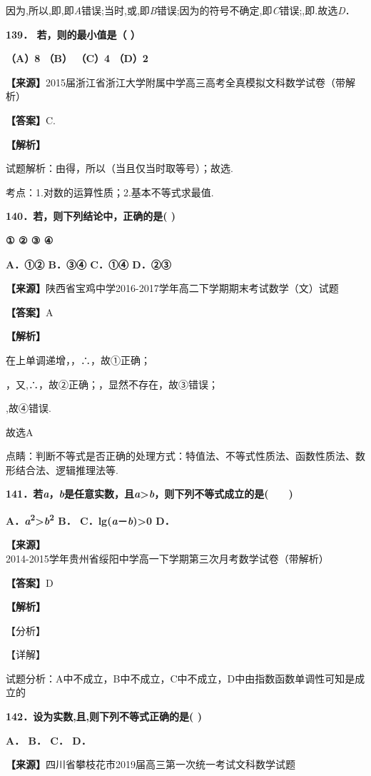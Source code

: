 \documentclass[
]{article}
\begin{document}
因为,所以,即,即\emph{A}错误;当时,或,即\emph{B}错误;因为的符号不确定,即\emph{C}错误;,即.故选\emph{D}．

\textbf{139． 若，则的最小值是（ ）}

\textbf{（A）8 （B） （C）4 （D）2}

\textbf{【来源】}2015届浙江省浙江大学附属中学高三高考全真模拟文科数学试卷（带解析）

\textbf{【答案】}C.

\textbf{【解析】}

试题解析：由得，所以（当且仅当时取等号）；故选.

考点：1.对数的运算性质；2.基本不等式求最值.

\textbf{140．若，则下列结论中，正确的是( )}

\textbf{① ② ③ ④}

\textbf{A．①② B．③④ C．①④ D．②③}

\textbf{【来源】}陕西省宝鸡中学2016-2017学年高二下学期期末考试数学（文）试题

\textbf{【答案】}A

\textbf{【解析】}

在上单调递增，，∴，故①正确；

，又,∴，故②正确；，显然不存在，故③错误；

,故④错误.

故选A

点睛：判断不等式是否正确的处理方式：特值法、不等式性质法、函数性质法、数形结合法、逻辑推理法等.

\textbf{141．若\emph{a}，\emph{b}是任意实数，且\emph{a}\textgreater{}\emph{b}，则下列不等式成立的是(　　)}

\textbf{A．\emph{a}\textsuperscript{2}\textgreater{}\emph{b}\textsuperscript{2}
B． C．lg(\emph{a}－\emph{b})\textgreater0 D．}

\textbf{【来源】}2014-2015学年贵州省绥阳中学高一下学期第三次月考数学试卷（带解析）

\textbf{【答案】}D

\textbf{【解析】}

【分析】

【详解】

试题分析：A中不成立，B中不成立，C中不成立，D中由指数函数单调性可知是成立的

\textbf{142．设为实数,且,则下列不等式正确的是( )}

\textbf{A． B． C． D．}

\textbf{【来源】}四川省攀枝花市2019届高三第一次统一考试文科数学试题
\end{document}
